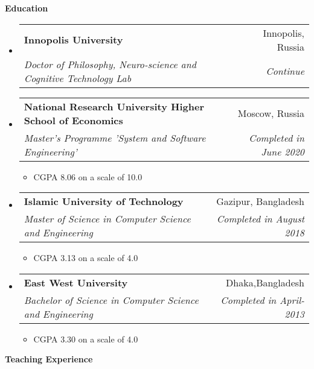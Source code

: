 \documentclass[letterpaper,10pt]{article}
\makeatletter
\newcommand{\resheading}[1]{{\large \colorbox{mygrey}{\begin{minipage}{\textwidth}{\textbf{#1 \vphantom{p\^{E}}}}\end{minipage}}}}
\newcommand{\ressubheading}[4]{
\begin{tabular*}{6.5in}{l@{\extracolsep{\fill}}r}
		\textbf{#1} & #2 \\
		\textit{#3} & \textit{#4} \\
\end{tabular*}\vspace{-6pt}}
\makeatother
\begin{document}
\resheading{Education}
\begin{itemize}


\item
	\ressubheading{Innopolis University}{Innopolis, Russia}{Doctor of Philosophy, Neuro-science and Cognitive Technology Lab}{Continue}

\item
	\ressubheading{National Research University Higher School of Economics}{Moscow, Russia}{Master’s Programme 'System and Software Engineering'}{Completed in June 2020}
	\begin{itemize}

		\item  CGPA 8.06 on a scale of 10.0

	\end{itemize}


\item
	\ressubheading{Islamic University of Technology}{Gazipur, Bangladesh}{Master of Science in Computer Science and Engineering }{Completed in August 2018}
\begin{itemize}

		\item  CGPA 3.13  on a scale of 4.0

	\end{itemize}
	
\item
	\ressubheading{East West University}{Dhaka,Bangladesh}{Bachelor of Science in Computer Science and Engineering}{Completed in April-2013}
	\begin{itemize}
		\item  CGPA 3.30 on a scale of 4.0

	\end{itemize}


\end{itemize}


\resheading{Teaching Experience}
\end{document}
